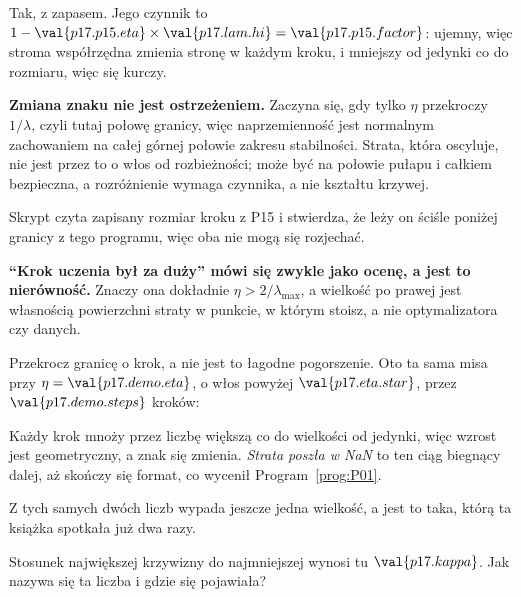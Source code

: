 \begin{fr}
\begin{ansblock}
Tak, z zapasem. Jego czynnik to
$1 - \val{p17.p15.eta} \times \val{p17.lam.hi} = \val{p17.p15.factor}$:
ujemny, więc stroma współrzędna zmienia stronę w każdym kroku, i mniejszy od
jedynki co do rozmiaru, więc się kurczy.
\end{ansblock}

\textbf{Zmiana znaku nie jest ostrzeżeniem.} Zaczyna się, gdy tylko $\eta$
przekroczy $1/\lambda$, czyli tutaj połowę granicy, więc naprzemienność jest
normalnym zachowaniem na całej górnej połowie zakresu stabilności. Strata,
która oscyluje, nie jest przez to o włos od rozbieżności; może być na połowie
pułapu i całkiem bezpieczna, a rozróżnienie wymaga czynnika, a nie kształtu
krzywej.

Skrypt czyta zapisany rozmiar kroku z P15 i stwierdza, że
leży on ściśle poniżej granicy z tego programu, więc oba nie mogą się
rozjechać.

\begin{trapbox}
\textbf{\enquote{Krok uczenia był za duży} mówi się zwykle jako ocenę, a jest
to nierówność.} Znaczy ona dokładnie $\eta > 2/\lambda_{\max}$, a wielkość po
prawej jest własnością powierzchni straty w punkcie, w którym stoisz, a nie
optymalizatora czy danych.

Przekrocz granicę o krok, a nie jest to łagodne pogorszenie. Oto ta sama misa
przy $\eta = \val{p17.demo.eta}$, o włos powyżej $\val{p17.eta.star}$, przez
$\val{p17.demo.steps}$ kroków:


Każdy krok mnoży przez liczbę większą co do wielkości od jedynki, więc wzrost
jest geometryczny, a znak się zmienia. \emph{Strata poszła w NaN} to ten ciąg
biegnący dalej, aż skończy się format, co wycenił Program~\ref{prog:P01}.
\end{trapbox}
\end{fr}

\begin{fr}
Z tych samych dwóch liczb wypada jeszcze jedna wielkość, a jest to taka, którą
ta książka spotkała już dwa razy.

Stosunek największej krzywizny do najmniejszej wynosi tu $\val{p17.kappa}$.
Jak nazywa się ta liczba i gdzie się pojawiała?
\dotline
\nextframe
\end{fr}

